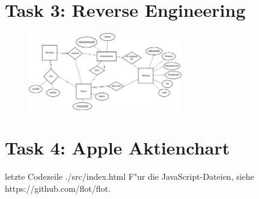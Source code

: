 \section*{Task 3: Reverse Engineering}
\begin{figure}[htbp]
  \centering
  \includegraphics[width=0.6\textwidth]{3.png}
\end{figure}

\section*{Task 4: Apple Aktienchart}
 letzte Codezeile
{./src/index.html}
F"ur die JavaScript-Dateien, siehe https://github.com/flot/flot.

\printbibliography %


